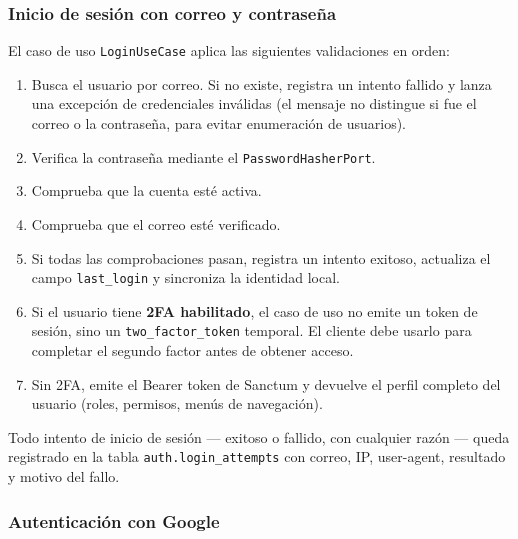 \documentclass[12pt,a4paper]{article}
\begin{document}
\subsubsection*{Inicio de sesión con correo y contraseña}

El caso de uso \texttt{LoginUseCase} aplica las siguientes validaciones en orden:
\begin{enumerate}
    \item Busca el usuario por correo. Si no existe, registra un intento fallido y
          lanza una excepción de credenciales inválidas (el mensaje no distingue
          si fue el correo o la contraseña, para evitar enumeración de usuarios).
    \item Verifica la contraseña mediante el \texttt{PasswordHasherPort}.
    \item Comprueba que la cuenta esté activa.
    \item Comprueba que el correo esté verificado.
    \item Si todas las comprobaciones pasan, registra un intento exitoso, actualiza
          el campo \texttt{last\_login} y sincroniza la identidad local.
    \item Si el usuario tiene \textbf{2FA habilitado}, el caso de uso no emite un
          token de sesión, sino un \texttt{two\_factor\_token} temporal. El cliente
          debe usarlo para completar el segundo factor antes de obtener acceso.
    \item Sin 2FA, emite el Bearer token de Sanctum y devuelve el perfil completo
          del usuario (roles, permisos, menús de navegación).
\end{enumerate}

Todo intento de inicio de sesión --- exitoso o fallido, con cualquier razón --- queda
registrado en la tabla \texttt{auth.login\_attempts} con correo, IP, user-agent,
resultado y motivo del fallo.

\subsubsection*{Autenticación con Google}
\end{document}

